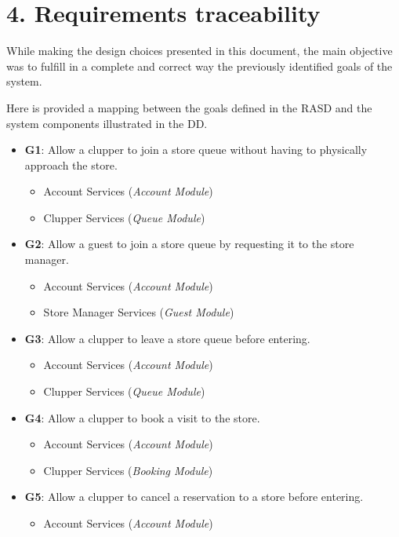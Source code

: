 \chapter{4. Requirements traceability}

While making the design choices presented in this document, the main objective was to fulfill in a complete and correct way the previously identified goals of the system.

Here is provided a mapping between the goals defined in the RASD and the system components illustrated in the DD.

\begin{itemize}
\item \textbf{G1}: Allow a clupper to join a store queue without having to physically approach the store.
    \begin{itemize}
        \item Account Services (\emph{Account Module})
        \item Clupper Services (\emph{Queue Module})
    \end{itemize}
\item \textbf{G2}: Allow a guest to join a store queue by requesting it to the store manager.
    \begin{itemize}
        \item Account Services (\emph{Account Module})
        \item Store Manager Services (\emph{Guest Module})
    \end{itemize}
\item \textbf{G3}: Allow a clupper to leave a store queue before entering.
    \begin{itemize}
        \item Account Services (\emph{Account Module})
        \item Clupper Services (\emph{Queue Module})
    \end{itemize}
\item \textbf{G4}: Allow a clupper to book a visit to the store.
    \begin{itemize}
        \item Account Services (\emph{Account Module})
        \item Clupper Services (\emph{Booking Module})
    \end{itemize}
\item \textbf{G5}: Allow a clupper to cancel a reservation to a store before entering.
    \begin{itemize}
        \item Account Services (\emph{Account Module})

\end{itemize}
\end{itemize}
